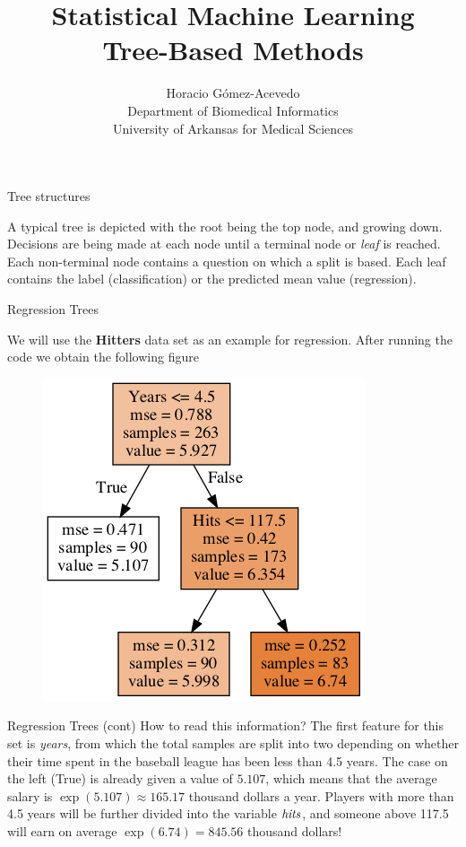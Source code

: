 \documentclass{beamer}
\title{Statistical Machine Learning\\ 
Tree-Based Methods}
\author{Horacio G\'omez-Acevedo\\ Department of Biomedical Informatics\\
University of Arkansas for Medical Sciences}
\begin{document}
	\begin{frame}[plain]
		\maketitle
	\end{frame}
	
	
	\begin{frame}{Tree structures}
		
		A typical tree is depicted with the root being the top node, and growing down. Decisions are being made at each node until a terminal node or {\it leaf} is reached. Each non-terminal node contains a question on which a split is based. Each leaf contains the label (classification) or the predicted mean value (regression).
		 
		
		
\end{frame}

\begin{frame}{Regression Trees}

We will use the {\bf Hitters} data set as an example for  regression.  After running the code we obtain the following figure

\begin{figure}[h]
	\centering
	\includegraphics[scale=0.5]{../../Figures/fig_hitters.png}
\end{figure}
	
	
\end{frame}

\begin{frame}{Regression Trees (cont)}
	How to read this information?
	The first feature for this set is {\it years}, from which the total samples are split into two depending on whether their time spent in the baseball league has been less than 4.5 years. The case on the left (True) is already given a value of $5.107$, which means that the average salary is $\exp(5.107)\approx 165.17$ thousand dollars a year. Players with more than 4.5 years will be further divided into the variable ${\it hits} $, and someone above 117.5 will earn on average $\exp(6.74)=845.56$ thousand dollars!
\end{frame}
\end{document}
